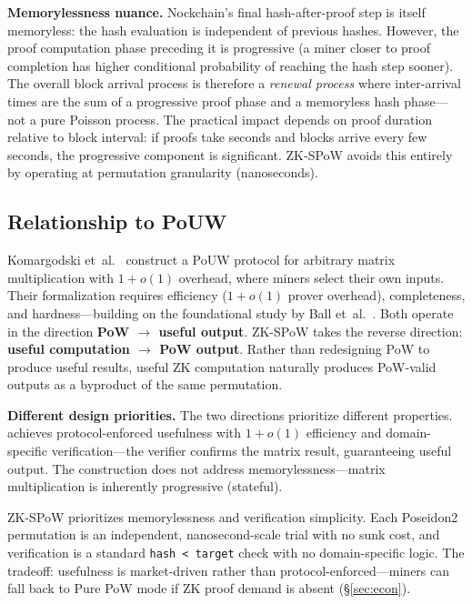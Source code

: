 \documentclass[11pt,a4paper]{article}
\begin{document}
\textbf{Memorylessness nuance.} Nockchain's final hash-after-proof step is itself memoryless: the hash evaluation is independent of previous hashes. However, the proof computation phase preceding it is progressive (a miner closer to proof completion has higher conditional probability of reaching the hash step sooner). The overall block arrival process is therefore a \emph{renewal process} where inter-arrival times are the sum of a progressive proof phase and a memoryless hash phase---not a pure Poisson process. The practical impact depends on proof duration relative to block interval: if proofs take seconds and blocks arrive every few seconds, the progressive component is significant. ZK-SPoW avoids this entirely by operating at permutation granularity (nanoseconds).

\subsection{Relationship to PoUW~\cite{ball2017,komargodski2025}}
\label{sec:pouw-comparison}

Komargodski et~al.~\cite{komargodski2025} construct a PoUW protocol for arbitrary matrix multiplication with $1+o(1)$ overhead, where miners select their own inputs. Their formalization requires efficiency ($1+o(1)$ prover overhead), completeness, and hardness---building on the foundational study by Ball et~al.~\cite{ball2017}. Both operate in the direction \textbf{PoW $\to$ useful output}. ZK-SPoW takes the reverse direction: \textbf{useful computation $\to$ PoW output}. Rather than redesigning PoW to produce useful results, useful ZK computation naturally produces PoW-valid outputs as a byproduct of the same permutation.

\textbf{Different design priorities.} The two directions prioritize different properties. \cite{komargodski2025} achieves protocol-enforced usefulness with $1+o(1)$ efficiency and domain-specific verification---the verifier confirms the matrix result, guaranteeing useful output. The construction does not address memorylessness---matrix multiplication is inherently progressive (stateful).

ZK-SPoW prioritizes memorylessness and verification simplicity. Each Poseidon2 permutation is an independent, nanosecond-scale trial with no sunk cost, and verification is a standard \texttt{hash < target} check with no domain-specific logic. The tradeoff: usefulness is market-driven rather than protocol-enforced---miners can fall back to Pure PoW mode if ZK proof demand is absent (\S\ref{sec:econ}).
\end{document}

